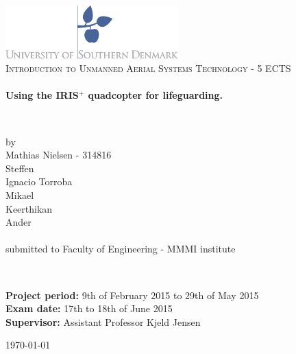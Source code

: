 \begin{titlepage}
\begin{center}

\includegraphics[width=0.5\textwidth]{./Images/logo.jpg}~\\[2cm]


\textsc{\Large Introduction to Unmanned Aerial Systems Technology - 5 ECTS}\\[1.5cm]

\HRule \\[0.4cm]
{ \huge \bfseries Using the IRIS$^{+}$ quadcopter for lifeguarding.  \\[0.4cm] }

\HRule \\[1.5cm]


\begin{center}
\begin{minipage}{0.5\textwidth} 
\large 
\center
 by\\
\LARGE
Mathias Nielsen - 314816\\
\LARGE
Steffen\\ 
\LARGE
Ignacio Torroba\\
\LARGE
Mikael \\
\LARGE
Keerthikan \\ 
\LARGE
Ander \\
\large
~\\
submitted to Faculty of Engineering - MMMI institute 

\end{minipage}
\end{center}

~\\[3cm]

\begin{flushleft}
\begin{minipage}{1\textwidth}
\large

\textbf{Project period:} 9th of February 2015 to 29th of May 2015\\[0.3cm]
\textbf{Exam date:} 17th to 18th of June 2015\\[0.3cm]
\textbf{Supervisor:} Assistant Professor Kjeld Jensen\\

\end{minipage}

\end{flushleft}

\vfill

{\large \today}
\end{center}
\end{titlepage}